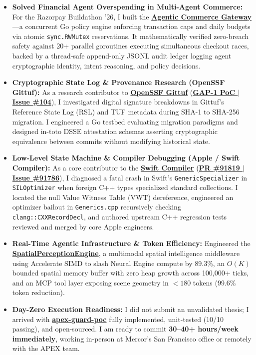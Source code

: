 \documentclass[10pt,a4paper]{article}
\begin{document}
\begin{itemize}
    \item \textbf{Solved Financial Agent Overspending in Multi-Agent Commerce:} 
    For the Razorpay Buildathon '26, I built the \href{https://github.com/imshubham22apr-gif/agentic-commerce-gateway}{\textbf{Agentic Commerce Gateway}}—a concurrent Go policy engine enforcing transaction caps and daily budgets via atomic \texttt{sync.RWMutex} reservations. It mathematically verified zero-breach safety against 20+ parallel goroutines executing simultaneous checkout races, backed by a thread-safe append-only JSONL audit ledger logging agent cryptographic identity, intent reasoning, and policy decisions.
    
    \item \textbf{Cryptographic State Log \& Provenance Research (OpenSSF Gittuf):} 
    As a research contributor to \href{https://github.com/gittuf/gittuf}{\textbf{OpenSSF Gittuf}} (\href{https://github.com/imshubham22apr-gif/gittuf/tree/main/experimental/hash-agility-poc}{\textbf{GAP-1 PoC $|$ Issue \#104}}), I investigated digital signature breakdowns in Gittuf's Reference State Log (RSL) and TUF metadata during SHA-1 to SHA-256 migration. I engineered a Go testbed evaluating migration paradigms and designed in-toto DSSE attestation schemas asserting cryptographic equivalence between commits without modifying historical state.
    
    \item \textbf{Low-Level State Machine \& Compiler Debugging (Apple / Swift Compiler):} 
    As a core contributor to the \href{https://github.com/swiftlang/swift}{\textbf{Swift Compiler}} (\href{https://github.com/swiftlang/swift/pull/91819}{\textbf{PR \#91819 $|$ Issue \#91786}}), I diagnosed a fatal crash in Swift's \texttt{GenericSpecializer} in \texttt{SILOptimizer} when foreign C++ types specialized standard collections. I located the null Value Witness Table (VWT) dereference, engineered an optimizer bailout in \texttt{Generics.cpp} recursively checking \texttt{clang::CXXRecordDecl}, and authored upstream C++ regression tests reviewed and merged by core Apple engineers.
    
    \item \textbf{Real-Time Agentic Infrastructure \& Token Efficiency:} 
    Engineered the \href{https://github.com/imshubham22apr-gif/SpatialPerceptionEngine}{\textbf{SpatialPerceptionEngine}}, a multimodal spatial intelligence middleware using Accelerate SIMD to slash Neural Engine compute by 89.3\%, an $O(K)$ bounded spatial memory buffer with zero heap growth across 100,000+ ticks, and an MCP tool layer exposing scene geometry in $<180$ tokens (99.6\% token reduction).
    
    \item \textbf{Day-Zero Execution Readiness:} 
    I did not submit an unvalidated thesis; I arrived with \href{https://github.com/imshubham22apr-gif/apex-guard-poc}{\textbf{apex-guard-poc}} fully implemented, unit-tested (10/10 passing), and open-sourced. I am ready to commit \textbf{30--40+ hours/week immediately}, working in-person at Mercor's San Francisco office or remotely with the APEX team.
\end{itemize}
\end{document}
